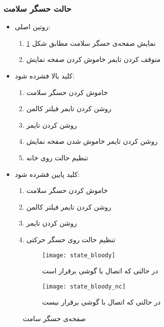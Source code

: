 \subsubsection{حالت حسگر سلامت}
\begin{itemize}
	\item روتین اصلی:
	\begin{enumerate}
		\item نمایش صفحه‌ی حسگر سلامت مطابق شکل \ref{fig:state-bloody}
		\item متوقف کردن تایمر خاموش کردن صفحه نمایش
	\end{enumerate}
	\item کلید بالا فشرده شود:
	\begin{enumerate}
		\item خاموش کردن حسگر سلامت
		\item روشن کردن تایمر فیلتر کالمن
		\item روشن کردن تایمر 
		\item روشن کردن تایمر خاموش شدن صفحه نمایش
		\item تنظیم حالت روی خانه
	\end{enumerate}
	\item کلید پایین فشرده شود:
	\begin{enumerate}
		\item خاموش کردن حسگر سلامت
		\item روشن کردن تایمر فیلتر کالمن
		\item روشن کردن تایمر 
		\item تنظیم حالت روی حسگر حرکتی
	\end{enumerate}
\end{itemize}
	\begin{figure}[h]
		\centering
		\begin{subfigure}{0.4\textwidth}
			\centering
			\texttt{[image: state\_bloody]}
			\caption{در حالتی که اتصال با گوشی برقرار است}
		\end{subfigure}
		\begin{subfigure}{0.4\textwidth}
			\centering
			\texttt{[image: state\_bloody\_nc]}
			\caption{در حالتی که اتصال با گوشی برقرار نیست}
		\end{subfigure}
		\caption{صفحه‌ی حسگر سامت}
		\label{fig:state-bloody}
	\end{figure}
